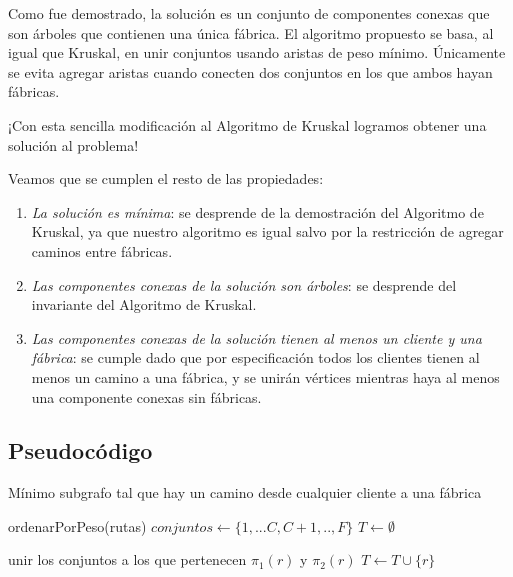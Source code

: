 \documentclass[a4paper]{report}
\begin{document}
Como fue demostrado, la solución es un conjunto de componentes conexas que son árboles que contienen una única fábrica. El algoritmo propuesto se basa, al igual que Kruskal, en unir conjuntos usando aristas de peso mínimo. Únicamente se evita agregar aristas cuando conecten dos conjuntos en los que ambos hayan fábricas.

¡Con esta sencilla modificación al Algoritmo de Kruskal logramos obtener una solución al problema!

Veamos que se cumplen el resto de las propiedades:

\begin{enumerate}
    \item \textit{La solución es mínima}: se desprende de la demostración del Algoritmo de Kruskal, ya que nuestro algoritmo es igual salvo por la restricción de agregar caminos entre fábricas.
    \item \textit{Las componentes conexas de la solución son árboles}: se desprende del invariante del Algoritmo de Kruskal.
    \item \textit{Las componentes conexas de la solución tienen al menos un cliente y una fábrica}: se cumple dado que por especificación todos los clientes tienen al menos un camino a una fábrica, y se unirán vértices mientras haya al menos una componente conexas sin fábricas.
\end{enumerate}

\subsection{Pseudocódigo}

\begin{algorithm} \caption{Mínimo subgrafo tal que hay un camino desde cualquier cliente a una fábrica}

    \begin{algorithmic}[1]
    
            
            \State ordenarPorPeso(rutas) 
            \State $conjuntos \leftarrow \{1,...C,C+1,..,F\}$
            \State $T \leftarrow \emptyset$
            
             
                    \State unir los conjuntos a los que pertenecen $\pi_{1}(r)$ y $\pi_{2}(r)$
                    \State $T \leftarrow T \cup \{ r \}$
                \EndIf
            \EndFor
        
        \EndFunction
    
    \end{algorithmic}

\end{algorithm}
\end{document}
